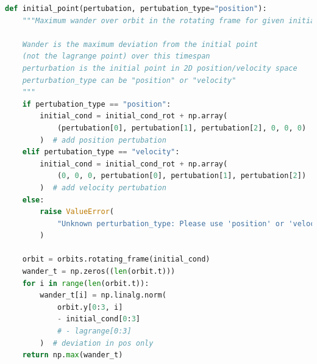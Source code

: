 \documentclass[11pt, a4paper,twocolumn]{article} %
\begin{document}
\begin{appendices}
\begin{lstlisting}[language=Python]
def initial_point(pertubation, pertubation_type="position"):
	"""Maximum wander over orbit in the rotating frame for given initial point 
	
	Wander is the maximum deviation from the initial point 
	(not the lagrange point) over this timespan
	perturbation is the initial point in 2D position/velocity space
	perturbation_type can be "position" or "velocity" 
	"""
	if pertubation_type == "position":
		initial_cond = initial_cond_rot + np.array(
			(pertubation[0], pertubation[1], pertubation[2], 0, 0, 0)
		)  # add position pertubation
	elif pertubation_type == "velocity":
		initial_cond = initial_cond_rot + np.array(
			(0, 0, 0, pertubation[0], pertubation[1], pertubation[2])
		)  # add velocity pertubation
	else:
		raise ValueError(
			"Unknown perturbation_type: Please use 'position' or 'velocity'"
		)
	
	orbit = orbits.rotating_frame(initial_cond)
	wander_t = np.zeros((len(orbit.t)))
	for i in range(len(orbit.t)):
		wander_t[i] = np.linalg.norm(
			orbit.y[0:3, i]
			- initial_cond[0:3]
			# - lagrange[0:3]
		)  # deviation in pos only
	return np.max(wander_t)

\end{lstlisting}

\end{appendices}


\restoregeometry
\end{document}
